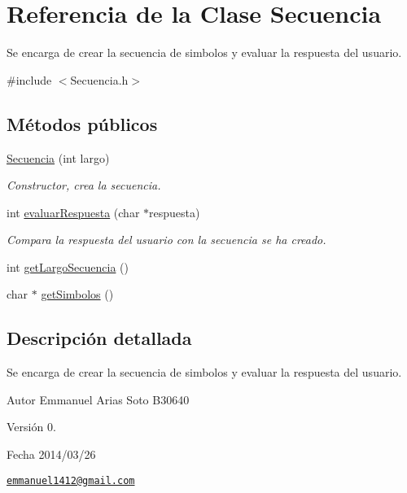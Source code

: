 \hypertarget{classSecuencia}{\section{Referencia de la Clase Secuencia}
\label{classSecuencia}
}


Se encarga de crear la secuencia de simbolos y evaluar la respuesta del usuario.  




{\ttfamily \#include $<$Secuencia.\-h$>$}

\subsection*{Métodos públicos}
\begin{DoxyCompactItemize}
\item 
\hyperlink{classSecuencia_a22fe0ee7da5c269e265e5996940cf73e}{Secuencia} (int largo)
\begin{DoxyCompactList}\small\item\em Constructor, crea la secuencia. \end{DoxyCompactList}\item 
int \hyperlink{classSecuencia_a4d83bb7921ec8838348c4e887b28644c}{evaluar\-Respuesta} (char $\ast$respuesta)
\begin{DoxyCompactList}\small\item\em Compara la respuesta del usuario con la secuencia se ha creado. \end{DoxyCompactList}\item 
int \hyperlink{classSecuencia_a9d78db236dd037a2acd620669cf2557e}{get\-Largo\-Secuencia} ()
\item 
char $\ast$ \hyperlink{classSecuencia_a174efa01bcb29b7b3fa19a2dac1c767b}{get\-Simbolos} ()
\end{DoxyCompactItemize}


\subsection{Descripción detallada}
Se encarga de crear la secuencia de simbolos y evaluar la respuesta del usuario. 

\begin{DoxyAuthor}{Autor}
Emmanuel Arias Soto B30640
\end{DoxyAuthor}
\begin{DoxyVersion}{Versión}
0.
\end{DoxyVersion}
\begin{DoxyDate}{Fecha}
2014/03/26
\end{DoxyDate}
\href{mailto:emmanuel1412@gmail.com}{\tt emmanuel1412@gmail.\-com} 

